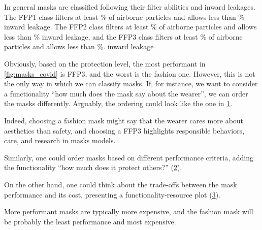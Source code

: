 In general masks are classified following their filter abilities and inward leakages. The FFP1 class filters at least \unit[80]{\%} of airborne particles and allows less than \unit[22]{\%} inward leakage.
The FFP2 class filters at least \unit[96]{\%} of airborne particles and allows less than \unit[8]{\%} inward leakage, and the FFP3 class filters at least \unit[99]{\%} of airborne particles and allows less than \unit[2]{\%}. inward leakage

Obviously, based on the protection level, the most performant in \cref{fig:masks_covid} is FFP3, and the worst is the fashion one.
However, this is not the only way in which we can classify masks. If, for instance, we want to consider a functionality ``how much does the mask say about the wearer'', we can order the masks differently.
Arguably, the ordering could look like the one in \cref{fig:masks_expressive}.

\begin{figure}[h!]
  \begin{center}
\end{center}
  \caption{\label{fig:masks_expressive}}
\end{figure}

Indeed, choosing a fashion mask might say that the wearer cares more about aesthetics than safety, and choosing a FFP3 highlights responsible behaviors, care, and research in masks models.

Similarly, one could order masks based on different performance criteria, adding the functionality ``how much does it protect others?'' (\cref{fig:masks_others}).

\begin{figure}[h!]
  \begin{center}
\end{center}
  \caption{\label{fig:masks_others}}
\end{figure}

On the other hand, one could think about the trade-offs between the mask performance and its cost, presenting a functionality-resource plot (\cref{fig:masks_price}).

\begin{figure}[h!]
  \begin{center}
\end{center}
  \caption{\label{fig:masks_price}}
\end{figure}

More performant masks are typically more expensive, and the fashion mask will be probably the least performance and most expensive.

